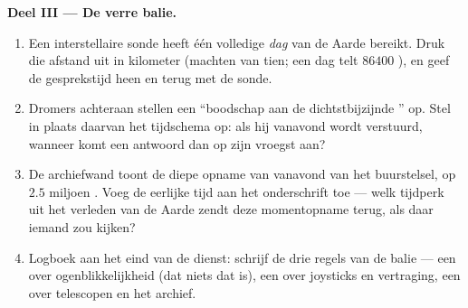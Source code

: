 \begin{problem}
\medskip\noindent\textbf{Deel III --- De verre balie.}
\begin{enumerate}[resume]
  \item Een interstellaire sonde heeft één volledige \emph{dag}
        van de Aarde bereikt. Druk die afstand uit in kilometer
        (machten van tien; een dag telt $86400$ ), en geef de
        gesprekstijd heen en terug met de sonde.
  \item Dromers achteraan stellen een ``boodschap aan de
        dichtstbijzijnde '' op. Stel in plaats daarvan het
        tijdschema op: als hij vanavond wordt verstuurd, wanneer komt
        een antwoord dan op zijn vroegst aan?
  \item De archiefwand toont de diepe opname van vanavond van
        het buurstelsel, op $2.5$ miljoen . Voeg de
        eerlijke tijd aan het onderschrift toe --- welk tijdperk uit
        het verleden van de Aarde zendt deze momentopname terug, als
        daar iemand zou kijken?
  \item Logboek aan het eind van de dienst: schrijf de drie regels van
        de balie --- een over ogenblikkelijkheid (dat niets dat is),
        een over joysticks en vertraging, een over telescopen en het
        archief.
\end{enumerate}
\end{problem}
